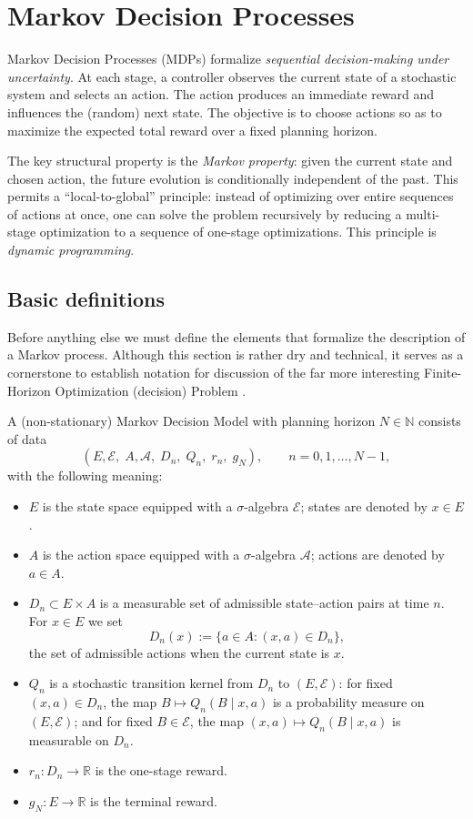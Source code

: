
\chapter{Markov Decision Processes}

Markov Decision Processes (MDPs) formalize \emph{sequential decision-making under uncertainty}. At each stage, a controller observes the current state of a stochastic system and selects an action. The action produces an immediate reward and influences the (random) next state. The objective is to choose actions so as to maximize the expected total reward over a fixed planning horizon.

The key structural property is the \emph{Markov property}: given the current state and chosen action, the future evolution is conditionally independent of the past. This permits a ``local-to-global'' principle: instead of optimizing over entire sequences of actions at once, one can solve the problem recursively by reducing a multi-stage optimization to a sequence of one-stage optimizations. This principle is \emph{dynamic programming}.

\section{Basic definitions}
Before anything else we must define the elements that formalize the description of a Markov process. Although this section is rather dry and technical, it serves as a cornerstone to establish notation for discussion of the far more interesting Finite-Horizon Optimization (decision) Problem .    

\begin{definition}
A (non-stationary) Markov Decision Model with planning horizon $N \in \mathbb{N}$ consists of data
\[
(E,\mathcal{E},\; A,\mathcal{A},\; D_n,\; Q_n,\; r_n,\; g_N), \qquad n=0,1,\dots,N-1,
\]
with the following meaning:
\begin{itemize}[leftmargin=*]
  \item $E$ is the state space equipped with a $\sigma$-algebra $\mathcal{E}$; states are denoted by $x\in E$.
  \item $A$ is the action space equipped with a $\sigma$-algebra $\mathcal{A}$; actions are denoted by $a\in A$.
  \item $D_n\subset E\times A$ is a measurable set of admissible state--action pairs at time $n$.
  For $x\in E$ we set
  \[
  D_n(x) := \{a\in A : (x,a)\in D_n\},
  \]
  the set of admissible actions when the current state is $x$.
  \item $Q_n$ is a stochastic transition kernel from $D_n$ to $(E,\mathcal{E})$:
  for fixed $(x,a)\in D_n$, the map $B\mapsto Q_n(B\mid x,a)$ is a probability measure on $(E,\mathcal{E})$; and for fixed $B\in\mathcal{E}$, the map $(x,a)\mapsto Q_n(B\mid x,a)$ is measurable on $D_n$.
  \item $r_n:D_n\to\mathbb{R}$ is the one-stage reward.
  \item $g_N:E\to\mathbb{R}$ is the terminal reward.
\end{itemize}
\end{definition}

